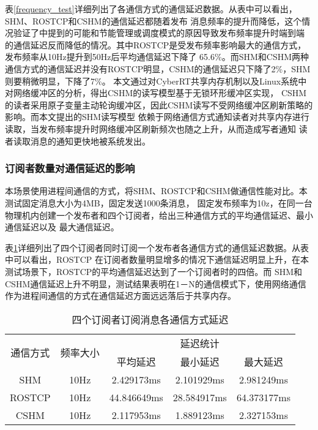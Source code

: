 表\ref{frequency_test}详细列出了各通信方式的通信延迟数据。从表中可以看出，SHM、ROSTCP和CSHM的通信延迟都随着发布
消息频率的提升而降低，这个情况验证了\cite{9591166}中提到的可能和节能管理或调度模式的原因导致发布频率提升时端到端
的通信延迟反而降低的情况。其中ROSTCP是受发布频率影响最大的通信方式，发布频率从10Hz提升到50Hz后平均通信延迟下降了
65.6\%。而SHM和CSHM两种通信方式的通信延迟并没有ROSTCP明显，CSHM的通信延迟只下降了2\%，SHM则要稍微明显，下降了7\%。
本文通过对CyberRT共享内存机制以及Linux系统中对网络缓冲区的分析，得出CSHM的读写模型基于无锁环形缓冲区实现，
CSHM的读者采用原子变量主动轮询缓冲区，因此CSHM读写不受网络缓冲区刷新策略的影响。而本文提出的SHM读写模型
依赖于网络通信方式通知读者对共享内存进行读取，当发布频率提升时网络缓冲区刷新频次也随之上升，从而造成写者通知
读者读取消息的通知更快地被系统发出。

\subsubsection{订阅者数量对通信延迟的影响}
本场景使用进程间通信的方式，将SHM、ROSTCP和CSHM做通信性能对比。本测试固定消息大小为4MB，固定发送1000条消息，
固定发布频率为10z，在同一台物理机内创建一个发布者和四个订阅者，给出三种通信方式的平均通信延迟、最小通信延迟以及
最大通信延迟。

表\ref{multi_subscribers}详细列出了四个订阅者同时订阅一个发布者各通信方式的通信延迟数据。从表中可以看出，ROSTCP
在订阅者数量明显增多的情况下通信延迟明显上升，在本测试场景下，ROSTCP的平均通信延迟达到了一个订阅者时的四倍。而
SHM和CSHM通信延迟上升不明显，测试结果表明在1－N的通信模式下，使用网络通信作为进程间通信的方式在通信延迟方面远远落后于共享内存。
\begin{table}[htb]
  \centering\small
  \caption{四个订阅者订阅消息各通信方式延迟}
  \renewcommand\arraystretch{1.2}
  \label{multi_subscribers}
  \begin{tabular}{ccccc}
    \toprule
    \multirow{2}{*}{通信方式} & \multirow{2}{*}{频率大小} & \multicolumn{3}{c}{延迟统计}\\
    \cline{3-5}
     & & 平均延迟 & 最小延迟 & 最大延迟\\
    \midrule
    SHM & 10Hz & 2.429173ms & 2.101929ms & 2.981249ms\\ 
    \hline
    ROSTCP & 10Hz & 44.846649ms & 28.584917ms & 64.373177ms\\ 
    \hline
    CSHM & 10Hz & 2.117953ms & 1.889123ms & 2.327153ms\\ 
    \bottomrule
  \end{tabular}
\end{table}

